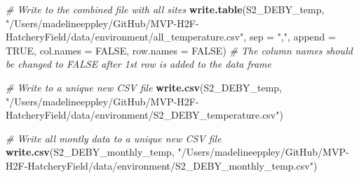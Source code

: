 \documentclass[
]{article}
\newenvironment{Shaded}{\begin{snugshade}}{\end{snugshade}}
\newcommand{\AttributeTok}[1]{\textcolor[rgb]{0.13,0.29,0.53}{#1}}
\newcommand{\CommentTok}[1]{\textcolor[rgb]{0.56,0.35,0.01}{\textit{#1}}}
\newcommand{\ConstantTok}[1]{\textcolor[rgb]{0.56,0.35,0.01}{#1}}
\newcommand{\FunctionTok}[1]{\textcolor[rgb]{0.13,0.29,0.53}{\textbf{#1}}}
\newcommand{\NormalTok}[1]{#1}
\newcommand{\StringTok}[1]{\textcolor[rgb]{0.31,0.60,0.02}{#1}}
\begin{document}
\begin{Shaded}
\begin{Highlighting}[]
\CommentTok{\# Write to the combined file with all sites }
\FunctionTok{write.table}\NormalTok{(S2\_DEBY\_temp, }\StringTok{"/Users/madelineeppley/GitHub/MVP{-}H2F{-}HatcheryField/data/environment/all\_temperature.csv"}\NormalTok{, }\AttributeTok{sep =} \StringTok{","}\NormalTok{, }\AttributeTok{append =} \ConstantTok{TRUE}\NormalTok{, }\AttributeTok{col.names =} \ConstantTok{FALSE}\NormalTok{, }\AttributeTok{row.names =} \ConstantTok{FALSE}\NormalTok{) }\CommentTok{\# The column names should be changed to FALSE after 1st row is added to the data frame}

\CommentTok{\# Write to a unique new CSV file}
\FunctionTok{write.csv}\NormalTok{(S2\_DEBY\_temp, }\StringTok{"/Users/madelineeppley/GitHub/MVP{-}H2F{-}HatcheryField/data/environment/S2\_DEBY\_temperature.csv"}\NormalTok{)}

\CommentTok{\# Write all montly data to a unique new CSV file}
\FunctionTok{write.csv}\NormalTok{(S2\_DEBY\_monthly\_temp, }\StringTok{"/Users/madelineeppley/GitHub/MVP{-}H2F{-}HatcheryField/data/environment/S2\_DEBY\_monthly\_temp.csv"}\NormalTok{)}
\end{Highlighting}
\end{Shaded}
\end{document}
